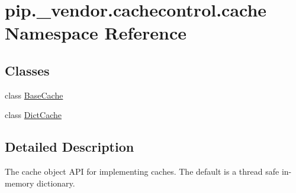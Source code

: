 \hypertarget{namespacepip_1_1__vendor_1_1cachecontrol_1_1cache}{}\section{pip.\+\_\+vendor.\+cachecontrol.\+cache Namespace Reference}
\label{namespacepip_1_1__vendor_1_1cachecontrol_1_1cache}
\subsection*{Classes}
\begin{DoxyCompactItemize}
\item 
class \hyperlink{classpip_1_1__vendor_1_1cachecontrol_1_1cache_1_1BaseCache}{Base\+Cache}
\item 
class \hyperlink{classpip_1_1__vendor_1_1cachecontrol_1_1cache_1_1DictCache}{Dict\+Cache}
\end{DoxyCompactItemize}


\subsection{Detailed Description}
\begin{DoxyVerb}The cache object API for implementing caches. The default is a thread
safe in-memory dictionary.
\end{DoxyVerb}
 